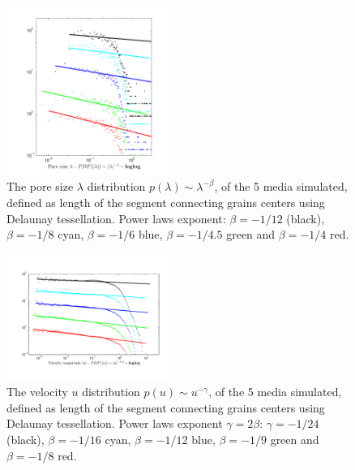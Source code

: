 \documentclass[onecolumn,showpacs,pre,preprintnumbers,floatfix]{revtex4-1}
\begin{document}
%
\begin{figure}[h!]
  \begin{center}
  \includegraphics[width=0.49\textwidth]{./images/PDF_all_lambda_shifted.pdf}
  \caption{The pore size $\lambda$ distribution $p(\lambda) \sim
  \lambda^{-\beta}$, of the 5 media simulated, defined as length of the
  segment connecting grains centers using Delaunay tessellation. Power
  laws exponent: $\beta = -1/12$ (black), $\beta = -1/8$ cyan, $\beta =
  -1/6$ blue, $\beta = -1/4.5$ green and $\beta = -1/4$
  red.}\label{f:geomDistribution} 
  \end{center}
\end{figure}
%

%
\begin{figure}[h!]
  \begin{center}
  \includegraphics[width=0.49\textwidth]{./images/PDF_all_velo_shifted2.pdf}
  \caption{The velocity $u$ distribution $p(u) \sim u^{-\gamma}$, of the
  5 media simulated, defined as length of the segment connecting grains
  centers using Delaunay tessellation. Power laws exponent $\gamma =
  2\beta$: $\gamma = -1/24$ (black), $\beta = -1/16$ cyan, $\beta =
  -1/12$ blue, $\beta = -1/9$ green and $\beta = -1/8$
  red.}\label{f:velocityDistribution} 
  \end{center}
\end{figure}
%
\end{document}
